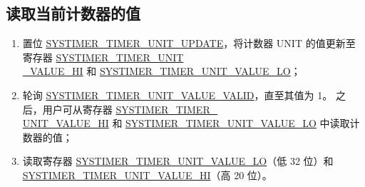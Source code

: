 \documentclass[main\_\_CN.tex]{subfiles}
\begin{document}
\subsection{读取当前计数器的值}\label{sec:to-read-system-timer-value}
\begin{enumerate}
    \item 置位 \hyperref[fielddesc:SYSTIMERTIMERUNIT0UPDATE]{SYSTIMER\_TIMER\_UNIT\_UPDATE}，将计数器 UNIT 的值更新至寄存器 \hyperref[fielddesc:SYSTIMERTIMERUNIT0VALUEHI]{SYSTIMER\_TIMER\_UNIT\\\_VALUE\_HI} 和 \hyperref[fielddesc:SYSTIMERTIMERUNIT0VALUELO]{SYSTIMER\_TIMER\_UNIT\_VALUE\_LO}；
    \item 轮询 \hyperref[fielddesc:SYSTIMERTIMERUNIT0VALUEVALID]{SYSTIMER\_TIMER\_UNIT\_VALUE\_VALID}，直至其值为 1。
    之后，用户可从寄存器 \hyperref[fielddesc:SYSTIMERTIMERUNIT0VALUEHI]{SYSTIMER\_TIMER\_\\UNIT{}\_VALUE\_HI} 和 \hyperref[fielddesc:SYSTIMERTIMERUNIT0VALUELO]{SYSTIMER\_TIMER\_UNIT\_VALUE\_LO} 中读取计数器的值；
    \item 读取寄存器 \hyperref[fielddesc:SYSTIMERTIMERUNIT0VALUELO]{SYSTIMER\_TIMER\_UNIT\_VALUE\_LO}（低 32 位）和 \hyperref[fielddesc:SYSTIMERTIMERUNIT0VALUEHI]{SYSTIMER\_TIMER\_UNIT\_VALUE\_HI}（高 20 位）。

\end{enumerate}
\end{document}
